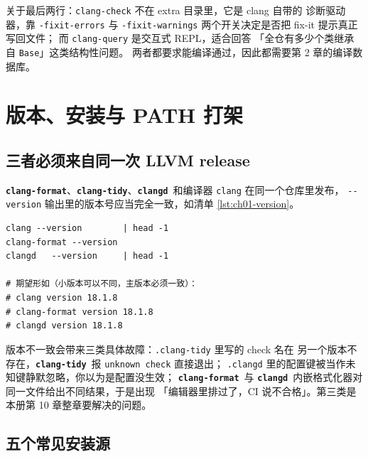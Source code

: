\documentclass[12pt,a4paper,fontset=fandol]{ctexbook}
\newcommand{\Tp}[1]{\texttt{#1}}
\newcommand{\Opt}[1]{\texttt{-\/-#1}}
\newcommand{\Lib}[1]{\textbf{\texttt{#1}}}
\newcommand{\Tidy}{\Lib{clang-tidy}}
\newcommand{\Fmt}{\Lib{clang-format}}
\newcommand{\CD}{\Lib{clangd}}
\begin{document}
关于最后两行：\texttt{clang-check} 不在 extra 目录里，它是 clang 自带的
诊断驱动器，靠 \texttt{-fixit-errors} 与 \texttt{-fixit-warnings}
两个开关决定是否把 fix-it 提示真正写回文件；
而 \texttt{clang-query} 是交互式 REPL，适合回答
「全仓有多少个类继承自 \Tp{Base}」这类结构性问题。
两者都要求能编译通过，因此都需要第 2 章的编译数据库。

\section{版本、安装与 PATH 打架}
\label{sec:ch01-s5}

\subsection*{三者必须来自同一次 LLVM release}

\Fmt、\Tidy、\CD\ 和编译器 \texttt{clang} 在同一个仓库里发布，
\Opt{version} 输出里的版本号应当完全一致，如清单 \ref{lst:ch01-version}。

\begin{lstlisting}[style=shellstyle,caption={版本自检：三行必须落在同一 release},label={lst:ch01-version}]
clang --version        | head -1
clang-format --version
clangd   --version     | head -1

# 期望形如（小版本可以不同，主版本必须一致）：
# clang version 18.1.8
# clang-format version 18.1.8
# clangd version 18.1.8
\end{lstlisting}

版本不一致会带来三类具体故障：\texttt{.clang-tidy} 里写的 check 名在
另一个版本不存在，\Tidy\ 报 \texttt{unknown check} 直接退出；
\texttt{.clangd} 里的配置键被当作未知键静默忽略，你以为是配置没生效；
\Fmt\ 与 \CD\ 内嵌格式化器对同一文件给出不同结果，于是出现
「编辑器里排过了，CI 说不合格」。第三类是本册第 10 章整章要解决的问题。

\subsection*{五个常见安装源}
\end{document}
